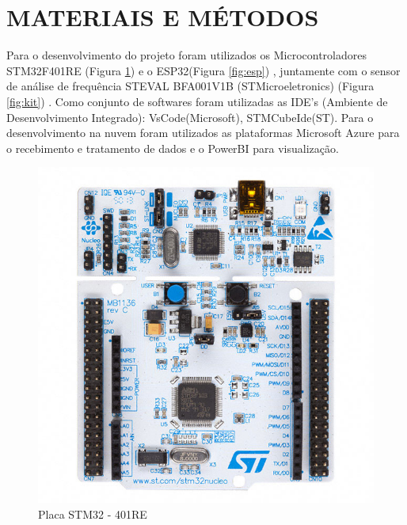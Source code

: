 \documentclass[
	article,			%
	12pt,				%
	oneside,			%
	a4paper,			%
	section=TITLE,		%
	subsection=TITLE,	%
	english,			%
	brazil,				%
	sumario=tradicional
	]{abntex2}
\begin{document}
\section*{MATERIAIS E MÉTODOS} 

Para o desenvolvimento do projeto foram utilizados os Microcontroladores STM32F401RE (Figura \ref{fig:placa }) e o ESP32(Figura \ref{fig:esp}) , juntamente com o sensor de análise de frequência STEVAL BFA001V1B (STMicroeletronics) (Figura \ref{fig:kit}) .
Como conjunto de softwares foram utilizadas as IDE's (Ambiente de Desenvolvimento Integrado): VsCode(Microsoft), STMCubeIde(ST). Para o desenvolvimento na nuvem foram utilizados as plataformas Microsoft Azure para o recebimento e tratamento de dados e o PowerBI para visualização.

\begin{figure}[H]
    \centering
    \includegraphics[scale=0.3]{stm32.jpg}
    \caption{Placa STM32 - 401RE}
    \label{fig:placa }
\end{figure}
\end{document}
